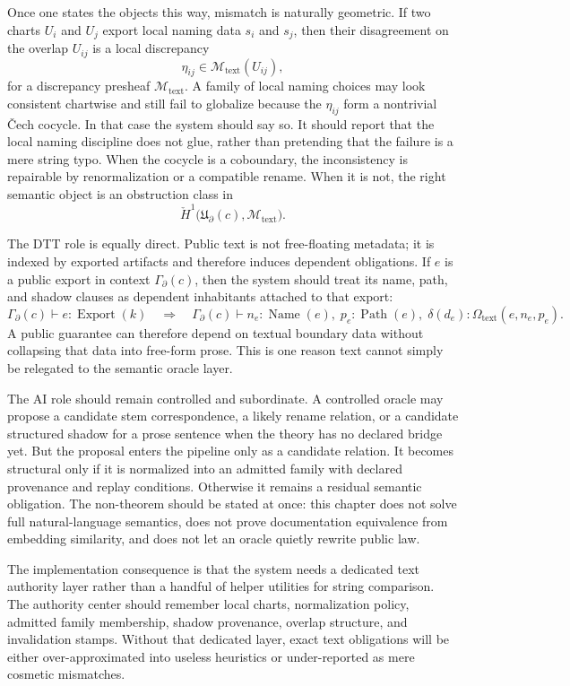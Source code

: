 \documentclass[11pt]{report}
\begin{document}
Once one states the objects this way, mismatch is naturally geometric. If two charts $U_i$ and $U_j$ export local naming data $s_i$ and $s_j$, then their disagreement on the overlap $U_{ij}$ is a local discrepancy
\[
\eta_{ij} \in \mathscr{M}_{\mathrm{text}}(U_{ij}),
\]
for a discrepancy presheaf $\mathscr{M}_{\mathrm{text}}$. A family of local naming choices may look consistent chartwise and still fail to globalize because the $\eta_{ij}$ form a nontrivial \v{C}ech cocycle. In that case the system should say so. It should report that the local naming discipline does not glue, rather than pretending that the failure is a mere string typo. When the cocycle is a coboundary, the inconsistency is repairable by renormalization or a compatible rename. When it is not, the right semantic object is an obstruction class in
\[
\check{H}^{1}\!\bigl(\mathfrak{U}_{\partial}(c),\mathscr{M}_{\mathrm{text}}\bigr).
\]

The DTT role is equally direct. Public text is not free-floating metadata; it is indexed by exported artifacts and therefore induces dependent obligations. If $e$ is a public export in context $\Gamma_{\partial}(c)$, then the system should treat its name, path, and shadow clauses as dependent inhabitants attached to that export:
\[
\Gamma_{\partial}(c)\vdash e : \operatorname{Export}(k)
\quad\Longrightarrow\quad
\Gamma_{\partial}(c)\vdash n_e : \operatorname{Name}(e),\;
p_e : \operatorname{Path}(e),\;
\delta(d_e) : \Omega_{\mathrm{text}}(e,n_e,p_e).
\]
A public guarantee can therefore depend on textual boundary data without collapsing that data into free-form prose. This is one reason text cannot simply be relegated to the semantic oracle layer.

The AI role should remain controlled and subordinate. A controlled oracle may propose a candidate stem correspondence, a likely rename relation, or a candidate structured shadow for a prose sentence when the theory has no declared bridge yet. But the proposal enters the pipeline only as a candidate relation. It becomes structural only if it is normalized into an admitted family with declared provenance and replay conditions. Otherwise it remains a residual semantic obligation. The non-theorem should be stated at once: this chapter does not solve full natural-language semantics, does not prove documentation equivalence from embedding similarity, and does not let an oracle quietly rewrite public law.

The implementation consequence is that the system needs a dedicated text authority layer rather than a handful of helper utilities for string comparison. The authority center should remember local charts, normalization policy, admitted family membership, shadow provenance, overlap structure, and invalidation stamps. Without that dedicated layer, exact text obligations will be either over-approximated into useless heuristics or under-reported as mere cosmetic mismatches.
\end{document}
